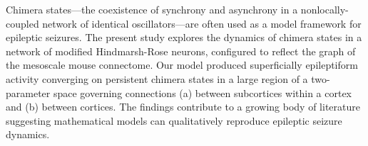 Chimera states---the coexistence of synchrony and asynchrony in a nonlocally-coupled network of identical oscillators---are often used as a model framework for epileptic seizures.
The present study explores the dynamics of chimera states in a network of modified Hindmarsh-Rose neurons, configured to reflect the graph of the mesoscale mouse connectome.
Our model produced superficially epileptiform activity converging on persistent chimera states in a large region of a two-parameter space governing connections (a) between subcortices within a cortex and (b) between cortices.
The findings contribute to a growing body of literature suggesting mathematical models can qualitatively reproduce epileptic seizure dynamics.